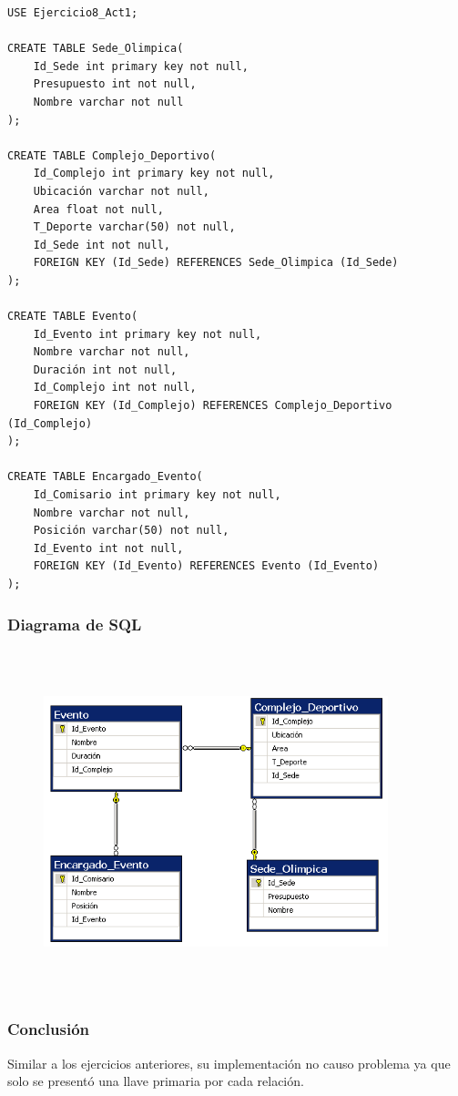 \documentclass[a4paper, 12pt]{article}
\begin{document}
\begin{justify}
\begin{verbatim}
USE Ejercicio8_Act1;

CREATE TABLE Sede_Olimpica(
    Id_Sede int primary key not null,
    Presupuesto int not null,
    Nombre varchar not null
);

CREATE TABLE Complejo_Deportivo(
    Id_Complejo int primary key not null,
    Ubicación varchar not null,
    Area float not null,
    T_Deporte varchar(50) not null,
    Id_Sede int not null,
    FOREIGN KEY (Id_Sede) REFERENCES Sede_Olimpica (Id_Sede)
);

CREATE TABLE Evento(
    Id_Evento int primary key not null,
    Nombre varchar not null,
    Duración int not null,
    Id_Complejo int not null,
    FOREIGN KEY (Id_Complejo) REFERENCES Complejo_Deportivo (Id_Complejo)
);

CREATE TABLE Encargado_Evento(
    Id_Comisario int primary key not null,
    Nombre varchar not null,
    Posición varchar(50) not null,
    Id_Evento int not null,
    FOREIGN KEY (Id_Evento) REFERENCES Evento (Id_Evento)
);
\end{verbatim}
        \subsubsection{Diagrama de SQL}
        \begin{figure}[H]
            \centering
            \includegraphics[width=10cm,height=10cm]{sql8.PNG}
        \end{figure}
        \subsubsection{Conclusión}
        \justify
        Similar a los ejercicios anteriores, su implementación no causo problema ya que solo se presentó una llave primaria por cada relación.

\end{justify}
\end{document}
